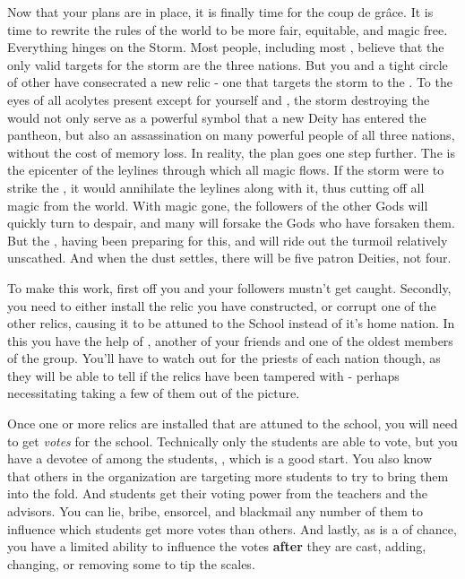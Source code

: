 \documentclass[char]{GL2020}
\begin{document}
Now that your plans are in place, it is finally time for the coup de grâce. It is time to rewrite the rules of the world to be more fair, equitable, and magic free. Everything hinges on the Storm. Most people, including most \pGoaties{}, believe that the only valid targets for the storm are the three nations. But you and a tight circle of other \pGoaties{} have consecrated a new relic - one that targets the storm to the \pSchool{}. To the eyes of all acolytes present except for yourself and \cChupSecond{}, the storm destroying the \pSc{} would not only serve as a powerful symbol that a new Deity has entered the pantheon, but also an assassination on many powerful people of all three nations, without the cost of memory loss. In reality, the plan goes one step further. The \pSc{} is the epicenter of the leylines through which all magic flows. If the storm were to strike the \pSc{}, it would annihilate the leylines along with it, thus cutting off all magic from the world. With magic gone, the followers of the other Gods will quickly turn to despair, and many will forsake the Gods who have forsaken them. But the \pGoaties{}, having been preparing for this, and will ride out the turmoil relatively unscathed. And when the dust settles, there will be five patron Deities, not four.

To make this work, first off you and your followers mustn't get caught. Secondly, you need to either install the relic you have constructed, or corrupt one of the other relics, causing it to be attuned to the School instead of it’s home nation. In this you have the help of \cChupInventor{}, another of your friends and one of the oldest members of the group. You’ll have to watch out for the priests of each nation though, as they will be able to tell if the relics have been tampered with - perhaps necessitating taking a few of them out of the picture.

Once one or more relics are installed that are attuned to the school, you will need to get \emph{votes} for the school. Technically only the students are able to vote, but you have a devotee of \cGenesis{} among the students, \cChupStudent{}, which is a good start. You also know that others in the organization are targeting more students to try to bring them into the fold. And students get their voting power from the teachers and the advisors. You can lie, bribe, ensorcel, and blackmail any number of them to influence which students get more votes than others. And lastly, as \cGenesis{} is a \cGenesis{\God} of chance, you have a limited ability to influence the votes \textbf{after} they are cast, adding, changing, or removing some to tip the scales.
\end{document}
